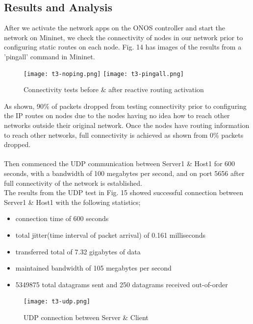 \documentclass{article}
\begin{document}
\subsection{Results and Analysis}
After we activate the network apps on the ONOS controller and start the network on Mininet, we check the connectivity of nodes in our network prior to configuring static routes on each node. Fig. 14 has images of the results from a 'pingall' command in Mininet. \\ 
  	\begin{figure}[h]
			\centering
			\texttt{[image: t3-noping.png]}
		\endminipage{} 
			\centering
			\texttt{[image: t3-pingall.png]}
		\endminipage{}
            	\caption{Connectivity tests before \& after reactive routing activation}
            	\label{fig:t3-2}
        \end{figure} 
\par As shown, 90\% of packets dropped from testing connectivity prior to configuring the IP routes on nodes due to the nodes having no idea how to reach other networks outside their original network. Once the nodes have routing information to reach other networks, full connectivity is achieved as shown from 0\% packets dropped. \\\\  Then commenced the UDP communication between Server1 \& Host1 for 600 seconds, with a bandwidth of 100 megabytes per second, and on port 5656 after full connectivity of the network is established. \\ The results from the UDP test in Fig. 15 showed successful connection between Server1 \& Host1 with the following statistics;
	\begin{itemize}
		\item connection time of 600 seconds
		\item total jitter(time interval of packet arrival) of 0.161 milliseconds
		\item transferred total of 7.32 gigabytes of data
		\item maintained bandwidth of 105 megabytes per second
		\item 5349875 total datagrams sent and 250 datagrams received out-of-order
	\end{itemize}
        \begin{figure}[h]
        		\centering
		\texttt{[image: t3-udp.png]}
		\caption{UDP connection between Server \& Client}
		\label{fig:t3-3}
        \end{figure}
        
\end{document}
